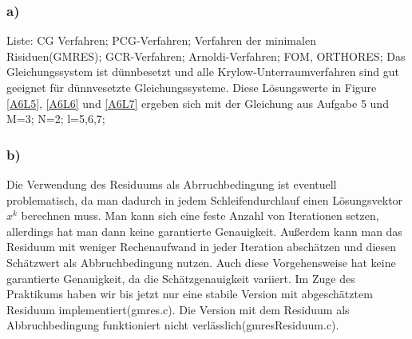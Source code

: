 \documentclass{article}
\begin{document}
	\subsubsection{a)}
	Liste: CG Verfahren; PCG-Verfahren; Verfahren der minimalen Risiduen(GMRES); GCR-Verfahren; Arnoldi-Verfahren; FOM, ORTHORES;\newline
	Das Gleichungssystem ist dünnbesetzt und alle Krylow-Unterraumverfahren sind gut geeignet f\"{u}r d\"{u}nnvesetzte Gleichungssysteme.
	Diese Lösungswerte in Figure \ref{A6L5}, \ref{A6L6} und \ref{A6L7} ergeben sich mit der Gleichung aus Aufgabe 5 und M=3; N=2; l=5,6,7;  \newline

	\subsubsection{b)}
	Die Verwendung des Residuums als Abrruchbedingung ist eventuell problematisch, da man dadurch in jedem Schleifendurchlauf einen Lösungsvektor $x^k$ berechnen muss. Man kann sich eine feste Anzahl von Iterationen setzen, allerdings hat man dann keine garantierte Genauigkeit. Außerdem kann man das Residuum mit weniger Rechenaufwand in jeder Iteration abschätzen und diesen Schätzwert als Abbruchbedingung nutzen. Auch diese Vorgehensweise hat keine garantierte Genauigkeit, da die Schätzgenauigkeit variiert. Im Zuge des Praktikums haben wir bis jetzt nur eine stabile Version mit abgeschätztem Residuum implementiert(gmres.c). Die Version mit dem Residuum als Abbruchbedingung funktioniert nicht verlässlich(gmresResiduum.c).
\end{document}
